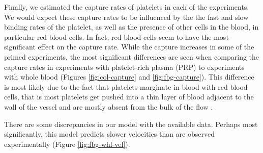 Finally, we estimated the capture rates of platelets in each of the
experiments. We would expect these capture rates to be influenced by
the the fast and slow binding rates of the platelet, as well as the
presence of other cells in the blood, in particular red blood
cells. In fact, red blood cells seem to have the most significant
effect on the capture rate. While the capture increases in some of the
primed experiments, the most significant differences are seen when
comparing the capture rates in experiments with platelet-rich plasma
(PRP) to experiments with whole blood (Figures \ref{fig:col-capture}
and \ref{fig:fbg-capture}). This difference is most likely due to the
fact that platelets marginate in blood with red blood cells, that is
most platelets get pushed into a thin layer of blood adjacent to the
wall of the vessel and are mostly absent from the bulk of the flow
.

There are some discrepancies in our model with the available
data. Perhaps most significantly, this model predicts slower
velocities than are observed experimentally (Figure
\ref{fig:fbg-whl-vel}). %











